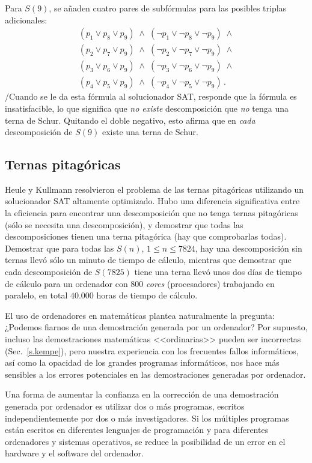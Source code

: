 Para $S(9)$, se añaden cuatro pares de subfórmulas para las posibles triplas adicionales:
\[
\begin{array}{l}
(p_1 \vee p_8 \vee p_9) \;\wedge\; (\neg p_1 \vee \neg p_8 \vee \neg p_9) \;\wedge \\
(p_2 \vee p_7 \vee p_9) \;\wedge\; (\neg p_2 \vee \neg p_7 \vee \neg p_9) \;\wedge \\
(p_3 \vee p_6 \vee p_9) \;\wedge\; (\neg p_3 \vee \neg p_6 \vee \neg p_9) \;\wedge \\
(p_4 \vee p_5 \vee p_9) \;\wedge\; (\neg p_4 \vee \neg p_5 \vee \neg p_9)\,.
\end{array}
\]
/Cuando se le da esta fórmula al solucionador SAT, responde que la fórmula es insatisfacible, lo que significa que \emph{no existe} descomposición que \emph{no} tenga una terna de Schur. Quitando el doble negativo, esto afirma que en \emph{cada} descomposición de $S(9)$ existe una terna de Schur.

\subsection{Ternas pitagóricas}

Heule y Kullmann resolvieron el problema de las ternas pitagóricas utilizando un solucionador SAT altamente optimizado. Hubo una diferencia significativa entre la eficiencia para encontrar una descomposición que no tenga ternas pitagóricas (sólo se necesita una descomposición), y demostrar que todas las descomposiciones tienen una terna pitagórica (hay que comprobarlas todas). Demostrar que para todas las $S(n)$, $1\leq n\leq 7824$, hay una descomposición sin ternas llevó sólo un minuto de tiempo de cálculo, mientras que demostrar que cada descomposición de $S(7825)$ tiene una terna llevó unos dos días de tiempo de cálculo para un ordenador con $800$ \emph{cores} (procesadores) trabajando en paralelo, en total $40.000$ horas de tiempo de cálculo.

El uso de ordenadores en matemáticas plantea naturalmente la pregunta: ¿Podemos fiarnos de una demostración generada por un ordenador? Por supuesto, incluso las demostraciones matemáticas <<ordinarias>> pueden ser incorrectas (Sec.~\ref{s.kempe}), pero nuestra experiencia con los frecuentes fallos informáticos, así como la opacidad de los grandes programas informáticos, nos hace más sensibles a los errores potenciales en las demostraciones generadas por ordenador.

Una forma de aumentar la confianza en la corrección de una demostración generada por ordenador es utilizar dos o más programas, escritos independientemente por dos o más investigadores. Si los múltiples programas están escritos en diferentes lenguajes de programación y para diferentes ordenadores y sistemas operativos, se reduce la posibilidad de un error en el hardware y el software del ordenador.


